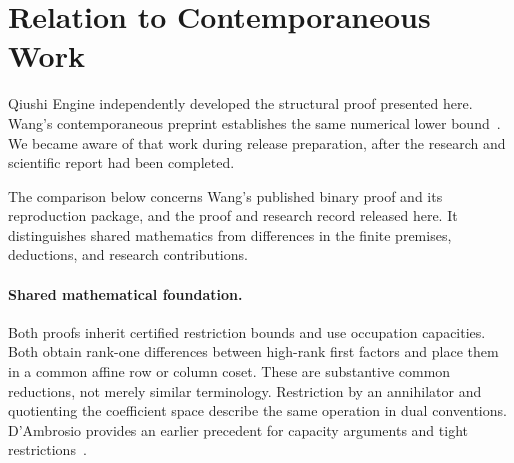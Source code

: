 \section{Relation to Contemporaneous Work}\label{app:comparison}

Qiushi Engine independently developed the structural proof presented here.
Wang's contemporaneous preprint establishes the same numerical lower
bound~\cite{wang2026twentyone}. We became aware of that work during release
preparation, after the research and scientific report had been completed.

The comparison below concerns Wang's published binary proof and its
reproduction package, and the proof and research record released here.
It distinguishes shared mathematics from differences in the finite
premises, deductions, and research contributions.

\paragraph{Shared mathematical foundation.}
Both proofs inherit certified restriction bounds and use occupation
capacities. Both obtain rank-one differences between high-rank first
factors and place them in a common affine row or column coset. These are
substantive common reductions, not merely similar terminology. Restriction
by an annihilator and quotienting the coefficient space describe the same
operation in dual conventions. D'Ambrosio provides an earlier precedent
for capacity arguments and tight restrictions~\cite{dambrosio2026}.

